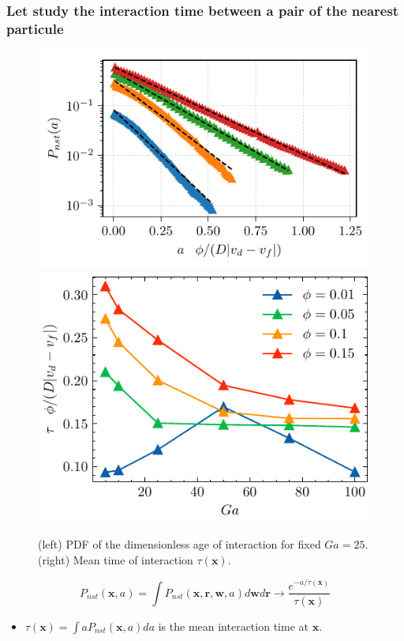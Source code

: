 \documentclass{sintefbeamer}
\begin{document}
\begin{frame}
  \frametitle{Let study the interaction time between  a pair of the nearest particule}
    \begin{figure}
        \includegraphics[height=0.23\textwidth]{image/HOMOGENEOUS/fDrop/P_a_Ga_25.pdf}
        \includegraphics[height=0.23\textwidth]{image/HOMOGENEOUS/fPA/ageGa.pdf}
        \caption{ (left) PDF of the dimensionless age of interaction for fixed $Ga = 25$.
      (right) Mean time of interaction $\tau(\textbf{x})$.}
    \end{figure}
  \begin{equation*}
    P_{nst}(\textbf{x},a) 
    = \int P_{nst}(\textbf{x},\textbf{r},\textbf{w},a) d\textbf{w}d\textbf{r}
    \rightarrow\frac{e^{-a/\tau(\textbf{x})}}{\tau(\textbf{x})}
  \end{equation*}
\begin{itemize}
  \item $\tau(\textbf{x}) = \int a P_{nst}(\textbf{x},a) da$ is the mean interaction time at $\textbf{x}$. 
\end{itemize}
\end{frame}
\end{document}
